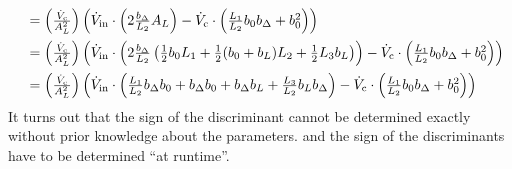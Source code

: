 \begin{equation}
\begin{array}{lll}
    \\\addlinespace
    &=   \left( \frac{\Vc}{\AL^2} \right)     
      \left(       
      \Vin  \cdot  \left(
      2 \frac{\bDelta}{L_2} \AL
      \right)
      - \Vc
      \cdot \left(      
      \frac{L_1}{L_2}  b_0\bDelta        
      + b_0^2                   
      \right)     
      \right)      
    \\\addlinespace
    &=
      \left( \frac{\Vc}{\AL^2} \right)     
      \left(       
      \Vin  \cdot  \left(
      2 \frac{\bDelta}{L_2}
      \left(
      \frac{1}{2} b_0  L_1 
      +  \frac{1}{2} (b_0 + b_L) L_2 
      + \frac{1}{2} L_3\bL        
      \right)      
      \right)
      - \Vc
      \cdot \left(      
      \frac{L_1}{L_2}  b_0\bDelta        
      + b_0^2                   
      \right)     
      \right)
    \\\addlinespace
    &=
      \left( \frac{\Vc}{\AL^2} \right)     
      \left(       
      \Vin  \cdot  \left(
      \frac{L_1 }{L_2} \bDelta b_0
      + \bDelta b_0
      + \bDelta b_L
      + \frac{L_3}{L_2} b_L \bDelta
      \right)          
      - \Vc
      \cdot \left(      
      \frac{L_1}{L_2}  b_0\bDelta        
      + b_0^2                   
      \right)
      \right)
  \end{array}
\end{equation}
It turns out that the sign of the discriminant cannot be determined exactly without prior knowledge about the 
parameters. and the sign of the discriminants have to be determined ``at runtime''.\clearpage
